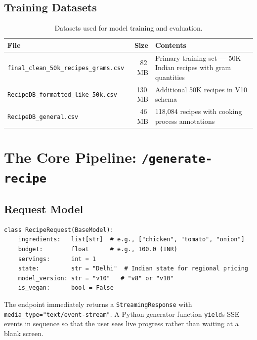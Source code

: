 \documentclass[12pt, a4paper]{article}
\begin{document}
\subsection{Training Datasets}

\begin{table}[H]
\centering
\caption{Datasets used for model training and evaluation.}
\label{tab:datasets}
\begin{tabularx}{\textwidth}{l r X}
\toprule
\textbf{File} & \textbf{Size} & \textbf{Contents} \\
\midrule
\texttt{final\_clean\_50k\_recipes\_grams.csv} & 82\,MB & Primary training set --- 50K Indian recipes with gram quantities \\
\texttt{RecipeDB\_formatted\_like\_50k.csv}    & 130\,MB & Additional 50K recipes in V10 schema \\
\texttt{RecipeDB\_general.csv}                 & 46\,MB  & 118,084 recipes with cooking process annotations \\
\bottomrule
\end{tabularx}
\end{table}

\section{The Core Pipeline: \texttt{/generate-recipe}}

\subsection{Request Model}

\begin{lstlisting}[style=python, caption={FastAPI request model for the main endpoint.}]
class RecipeRequest(BaseModel):
    ingredients:   list[str]  # e.g., ["chicken", "tomato", "onion"]
    budget:        float      # e.g., 100.0 (INR)
    servings:      int = 1
    state:         str = "Delhi"  # Indian state for regional pricing
    model_version: str = "v10"   # "v8" or "v10"
    is_vegan:      bool = False
\end{lstlisting}

The endpoint immediately returns a \texttt{StreamingResponse} with
\texttt{media\_type="text/\allowbreak event-stream"}.  A Python generator function \texttt{yield}s SSE
events in sequence so that the user sees live progress rather than waiting at a blank screen.
\end{document}
